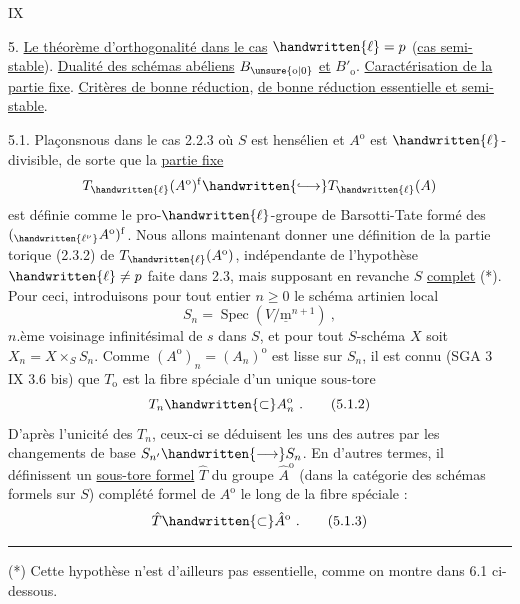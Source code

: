 \hfill IX

5. \uline{Le théorème d'orthogonalité dans le cas} $\handwritten{\ell}=p$ (\uline{cas semi-stable}). \uline{Dualité des schémas abéliens} $B_{\unsure{\mathrm o|0}}$ \uline{et} $B'_{\mathrm o}$. \uline{Caractérisation de la partie fixe}. \uline{Critères de bonne réduction}, \uline{de bonne réduction essentielle et semi-stable}.

5.1. Plaçons\unsure{-|\,}nous dans le cas 2.2.3 où $S$ est hensélien et $A^{\mathrm o}$ est $\handwritten{\ell}$-divisible, de sorte que la \uline{partie fixe}
\[
T_{\handwritten{\ell}}(A^{\mathrm o})^{\mathrm f}\handwritten{\lhook\joinrel\longrightarrow}T_{\handwritten{\ell}}(A)
\]
est définie comme le pro-$\handwritten{\ell}$-groupe de Barsotti-Tate formé des $({}_{\handwritten{\ell^\nu}}A^{\mathrm o})^{\mathrm f}$. Nous allons maintenant donner une définition de la partie torique (2.3.2) de $T_{\handwritten{\ell}}(A^{\mathrm o})$, indépendante de l'hypothèse $\handwritten{\ell}\ne p$ faite dans 2.3, mais supposant en revanche $S$ \uline{complet} (*). Pour ceci, introduisons pour tout entier $n\geq0$ le schéma artinien local
\[
S_n=\operatorname{Spec}(V/\underline{\mathrm m}^{n+1})\ ,\tag*{(5.1.1)}
\]
$n$.ème voisinage infinitésimal de $s$ dans $S$, et pour tout $S$-schéma $X$ soit $X_n=X\times_S S_n$. Comme $(A^{\mathrm o})_n=(A_n)^{\mathrm o}$ est lisse sur $S_n$, il est connu (SGA 3 IX 3.6 bis) que $T_{\mathrm o}$ est la fibre spéciale d'un unique sous-tore
\[
T_n\handwritten{\subset}A_n^{\mathrm o}\ .\tag*{(5.1.2)}
\]
D'après l'unicité des $T_n$, ceux-ci se déduisent les uns des autres par les changements de base $S_{n'}\handwritten{\longrightarrow} S_n$. En d'autres termes, il définissent un \uline{sous-tore formel} $\hat T$ du groupe $\hat A^{\mathrm o}$ (dans la catégorie des schémas formels sur $S$) complété formel de $A^{\mathrm o}$ le long de la fibre spéciale :
\[
\hat T\handwritten{\subset}\hat A^{\mathrm o}\ .\tag*{(5.1.3)}
\]
\noindent\rule{6em}{.4pt}\par
(*) Cette hypothèse n'est d'ailleurs pas essentielle, comme on montre dans 6.1 ci-dessous.
